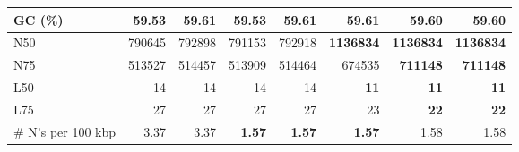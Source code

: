 \documentclass[12pt,a4paper]{article}
\begin{document}
\begin{table}[ht]
\begin{center}
\begin{tabular}{|l*{7}{|r}|}
GC (\%) & 59.53 & 59.61 & 59.53 & 59.61 & 59.61 & 59.60 & 59.60 \\ \hline
N50 & 790645 & 792898 & 791153 & 792918 & {\bf 1136834} & {\bf 1136834} & {\bf 1136834} \\ \hline
N75 & 513527 & 514457 & 513909 & 514464 & 674535 & {\bf 711148} & {\bf 711148} \\ \hline
L50 & 14 & 14 & 14 & 14 & {\bf 11} & {\bf 11} & {\bf 11} \\ \hline
L75 & 27 & 27 & 27 & 27 & 23 & {\bf 22} & {\bf 22} \\ \hline
\# N's per 100 kbp & 3.37 & 3.37 & {\bf 1.57} & {\bf 1.57} & {\bf 1.57} & 1.58 & 1.58 \\ \hline
\end{tabular}
\end{center}
\end{table}
\end{document}
